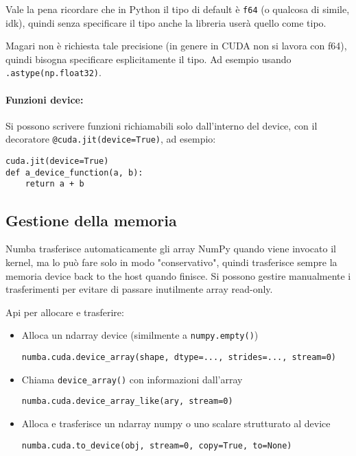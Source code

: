 Vale la pena ricordare che in Python il tipo di default è \texttt{f64} (o qualcosa di simile, idk), quindi senza specificare il tipo anche la libreria userà quello come tipo.

Magari non è richiesta tale precisione (in genere in CUDA non si lavora con f64), quindi bisogna specificare esplicitamente il tipo. Ad esempio usando \texttt{.astype(np.float32)}.

\paragraph{Funzioni device:} Si possono scrivere funzioni richiamabili solo dall'interno del device, con il decoratore \texttt{@cuda.jit(device=True)}, ad esempio:
\begin{verbatim}
cuda.jit(device=True)
def a_device_function(a, b):
	return a + b
\end{verbatim}

\subsection{Gestione della memoria}

Numba trasferisce automaticamente gli array NumPy quando viene invocato il kernel, ma lo può fare solo in modo "conservativo", quindi trasferisce sempre la memoria device back to the host quando finisce. Si possono gestire manualmente i trasferimenti per evitare di passare inutilmente array read-only.

Api per allocare e trasferire:
\begin{itemize}
	\item Alloca un ndarray device (similmente a \texttt{numpy.empty()})
	\begin{verbatim}
numba.cuda.device_array(shape, dtype=..., strides=..., stream=0)
	\end{verbatim}
	
	\item Chiama \texttt{device\_array()} con informazioni dall'array
	\begin{verbatim}
numba.cuda.device_array_like(ary, stream=0)
	\end{verbatim}
	
	\item Alloca e trasferisce un ndarray numpy o uno scalare strutturato al device
	\begin{verbatim}
numba.cuda.to_device(obj, stream=0, copy=True, to=None)
	\end{verbatim}
\end{itemize}

